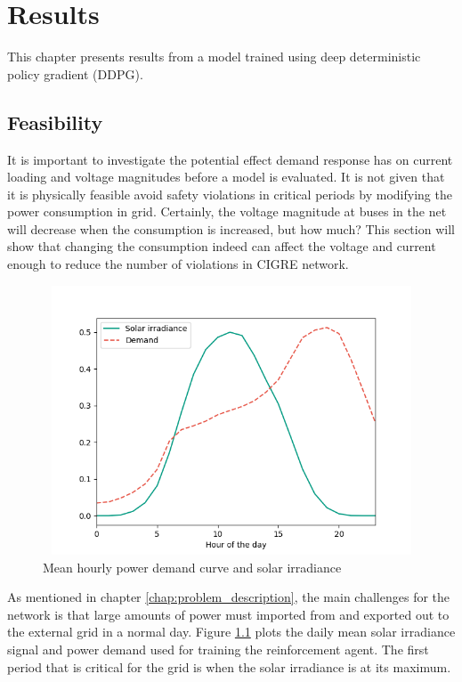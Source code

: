 \documentclass[class=book, crop=false, 11pt]{standalone}
\begin{document}
\chapter{Results}\label{chapter:results}

This chapter presents results from a model trained using deep deterministic policy gradient (DDPG).

\section{Feasibility}
It is important to investigate the potential effect demand response has on current loading and voltage magnitudes before a model is evaluated. It is not given that it is physically feasible avoid safety violations in critical periods by modifying the power consumption in grid. Certainly, the voltage magnitude at buses in the net will decrease when the consumption is increased, but how much? This section will show that changing the consumption indeed can affect the voltage and current enough to reduce the number of violations in CIGRE network.
\begin{figure}[h]
    \center
\includegraphics[height=8cm, width=12cm]{figures/demand_and_solar.png}
    \caption {Mean hourly power demand curve and solar irradiance}
    \label{fig:results:demand_and_solar}
\end{figure}

As mentioned in chapter \ref{chap:problem_description}, the main challenges for the network is that large amounts of power must imported from and exported out to the external grid in a normal day. Figure \ref{fig:results:demand_and_solar} plots the daily mean solar irradiance signal and power demand used for training the reinforcement agent. The first period that is critical for the grid is when the solar irradiance is at its maximum. 
\end{document}

